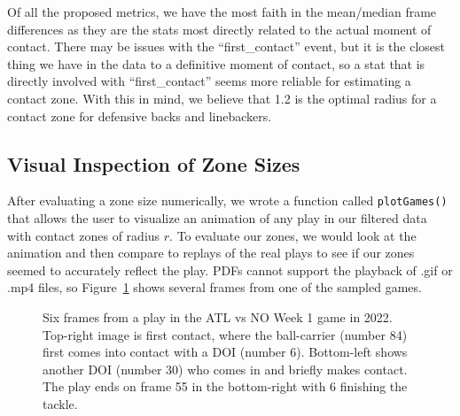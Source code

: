 \documentclass[
  12pt]{article}
\begin{document}
Of all the proposed metrics, we have the most faith in the mean/median
frame differences as they are the stats most directly related to the
actual moment of contact. There may be issues with the
``first\_contact'' event, but it is the closest thing we have in the
data to a definitive moment of contact, so a stat that is directly
involved with ``first\_contact'' seems more reliable for estimating a
contact zone. With this in mind, we believe that 1.2 is the optimal
radius for a contact zone for defensive backs and linebackers.

\subsection{Visual Inspection of Zone
Sizes}\label{visual-inspection-of-zone-sizes}

After evaluating a zone size numerically, we wrote a function called
\texttt{plotGames()} that allows the user to visualize an animation of
any play in our filtered data with contact zones of radius \(r\). To
evaluate our zones, we would look at the animation and then compare to
replays of the real plays to see if our zones seemed to accurately
reflect the play. PDFs cannot support the playback of .gif or .mp4
files, so Figure~\ref{fig-animated} shows several frames from one of the
sampled games.

\begin{figure}


\caption{\label{fig-animated}Six frames from a play in the ATL vs NO
Week 1 game in 2022. Top-right image is first contact, where the
ball-carrier (number 84) first comes into contact with a DOI (number 6).
Bottom-left shows another DOI (number 30) who comes in and briefly makes
contact. The play ends on frame 55 in the bottom-right with 6 finishing
the tackle.}

\end{figure}%
\end{document}
